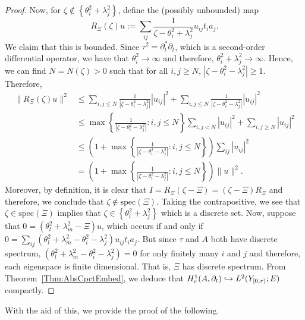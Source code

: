 \documentclass[a4paper,10pt,reqno]{amsart}
\newcommand{\spec}{\mathrm{spec}}%
\newcommand{\cbrac}[1]{\left(#1\right)}
\newcommand{\dbrac}[1]{\left\{#1\right\}}
\newcommand{\modulus}[1]{|#1|}
\newcommand{\norm}[1]{\| #1 \|}%
\newcommand{\set}[1]{\dbrac{#1}}
\newcommand{\Lp}[2][{}]{{\rm L}^{#2}_{\rm #1}}%
\newcommand{\Hard}[2][{}]{{\rm H}^{#2}_{\rm #1}}%
\newcommand{\SobH}[2][{}]{\Hard[#1]{\rm #2}}
\newcommand{\embed}{\hookrightarrow}%
\theoremstyle{definition}
\begin{document}
\begin{proof}
Now, for $\zeta \not \in \set{\theta_i^2 + \lambda_j^2}$, define the (possibly unbounded) map 
$$R_{\Xi}(\zeta)u := \sum_{ij} \frac{1}{\zeta - \theta_i^2 + \lambda_j^2} u_{ij} t_i a_j.$$
We claim that this is bounded.
Since $\tau^2 = \partial_t^\ast \partial_t$, which is a second-order differential operator, we have that $\theta_i^2 \to \infty$ and therefore, $\theta_i^2 + \lambda_j^2 \to \infty$.
Hence, we can find $N = N(\zeta)> 0$ such that for all $i,j \geq N$, $\modulus{\zeta - \theta_i^2 - \lambda_j^2} \geq 1$.
Therefore,
\begin{align*} 
\norm{R_{\Xi}(\zeta)u}^2 
&\leq 
\sum_{i,j \leq N} \frac{1}{\modulus{\zeta - \theta_i^2 - \lambda_j^2}} \modulus{u_{ij}}^2 + \sum_{i,j \leq N} \frac{1}{\modulus{\zeta - \theta_i^2 - \lambda_j^2}} \modulus{u_{ij}}^2 \\ 
&\leq \max\set{\frac{1}{\modulus{\zeta - \theta_i^2 - \lambda_j^2}}: i,j \leq N}  \sum_{i,j < N} \modulus{u_{ij}}^2 + \sum_{i,j \geq N}  \modulus{u_{ij}}^2 \\
&\leq \cbrac{1 + \max\set{\frac{1}{\modulus{\zeta - \theta_i^2 - \lambda_j^2}}: i,j \leq N}} \sum_{ij} \modulus{u_{ij}}^2 \\ 
&= \cbrac{1 + \max\set{\frac{1}{\modulus{\zeta - \theta_i^2 - \lambda_j^2}}: i,j \leq N}}  \norm{u}^2.
\end{align*}
Moreover, by definition, it is clear that $I = R_{\Xi}(\zeta - \Xi) = (\zeta - \Xi)R_{\Xi}$ and therefore, we conclude that $\zeta \not \in \spec(\Xi)$.
Taking the contrapositive, we see that $\zeta \in \spec(\Xi)$ implies that $\zeta \in \set{\theta_i^2 + \lambda_j^2}$ which is a discrete set.
Now, suppose that $0 = (\theta_l^2 + \lambda_m^2 - \Xi)u$, which occurs if and only if $0 = \sum_{ij} (\theta_l^2 + \lambda_m^2 - \theta_i^2 - \lambda_j^2) u_{ij} t_i a_j$. 
But since $\tau$ and $A$ both have discrete spectrum, $(\theta_l^2 + \lambda_m^2 - \theta_i^2 - \lambda_j^2) = 0$ for only finitely many $i$ and $j$ and therefore, each eigenspace is finite dimensional. 
That is, $\Xi$ has discrete spectrum. 
From Theorem~\ref{Thm:AbsCpctEmbed}, we deduce that $\SobH[r]{1}(A,\partial_t) \embed \Lp{2}(Y_{[0,r)};E)$ compactly. 
\end{proof} 

With the aid of this, we provide the proof of the following. 
\end{document}

